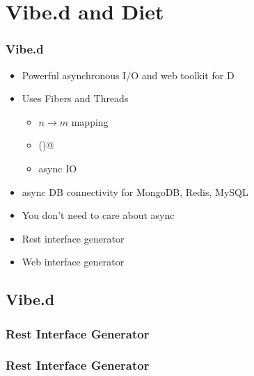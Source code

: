 \documentclass[xelatex,13pt]{beamer}
\begin{document}
\section{Vibe.d and Diet}
\begin{frame}
	\frametitle{Vibe.d}
	\begin{itemize}
		\item Powerful asynchronous I/O and web toolkit for D
		\item Uses Fibers and Threads
			\pause
			\begin{itemize}
				\item \(n \rightarrow m\) mapping
				\item \lstinline@yield()@
				\item async IO
			\end{itemize}
			\pause
		\item async DB connectivity for MongoDB, Redis, MySQL
		\item You don't need to care about async
		\item Rest interface generator
		\item Web interface generator
	\end{itemize}
\end{frame}

\subsection{Vibe.d}
\begin{frame}
	\frametitle{Rest Interface Generator}
	
	\pause
	
\end{frame}
\begin{frame}
	\frametitle{Rest Interface Generator}
	
	\pause
	\vspace{1cm}
	
\end{frame}
\end{document}
